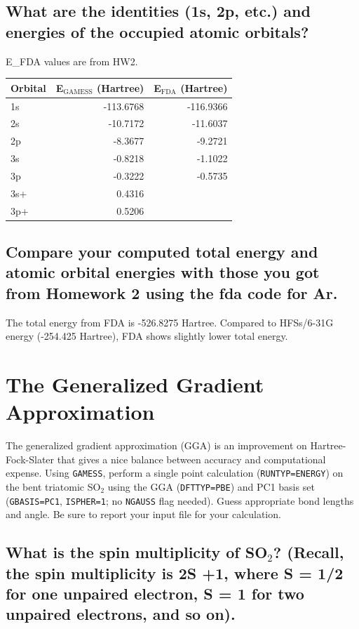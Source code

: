 \documentclass[11pt]{article}
\begin{document}
\subsection{What are the identities (1s, 2p, etc.) and energies of the occupied atomic orbitals?}
\label{sec:org9bd422a}

E\_FDA values are from HW2.

\begin{center}
\begin{tabular}{lrr}
Orbital & E\(_{\text{GAMESS}}\) (Hartree) & E\(_{\text{FDA}}\) (Hartree)\\
\hline
1s & -113.6768 & -116.9366\\
2s & -10.7172 & -11.6037\\
2p & -8.3677 & -9.2721\\
3s & -0.8218 & -1.1022\\
3p & -0.3222 & -0.5735\\
3s+ & 0.4316 & \\
3p+ & 0.5206 & \\
\end{tabular}
\end{center}

\subsection{Compare your computed total energy and atomic orbital energies with those you got from Homework 2 using the fda code for Ar.}
\label{sec:orgf349d4d}

The total energy from FDA is -526.8275 Hartree. Compared to HFSs/6-31G energy (-254.425 Hartree), FDA shows slightly lower total energy.

\section{The Generalized Gradient Approximation}
\label{sec:orgafc2456}

The generalized gradient approximation (GGA) is an improvement on Hartree-Fock-Slater that gives a nice balance between accuracy and computational expense. Using \texttt{GAMESS}, perform a single point calculation (\texttt{RUNTYP=ENERGY}) on the bent triatomic SO\(_{\text{2}}\) using the GGA (\texttt{DFTTYP=PBE}) and PC1 basis set (\texttt{GBASIS=PC1}, \texttt{ISPHER=1}; no \texttt{NGAUSS} flag needed). Guess appropriate bond lengths and angle. Be sure to report your input file for your calculation.

\subsection{What is the spin multiplicity of SO\(_{\text{2}}\)? (Recall, the spin multiplicity is 2S +1, where S = 1/2 for one unpaired electron, S = 1 for two unpaired electrons, and so on).}
\label{sec:org8f8e502}
\end{document}
